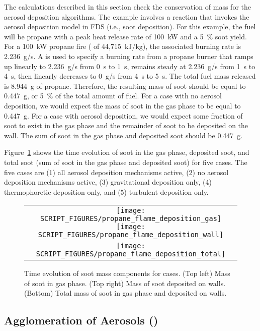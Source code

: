 \documentclass[11pt]{book}
\begin{document}
The calculations described in this section check the conservation of mass for the aerosol deposition algorithms. The example involves a reaction that invokes the aerosol deposition model in FDS (i.e., soot deposition). For this example, the fuel will be propane with a peak heat release rate of 100~kW and a 5~\% soot yield. For a 100~kW propane fire ( of 44,715~kJ/kg), the associated burning rate is 2.236~g/s. A  is used to specify a burning rate from a propane burner that ramps up linearly to 2.236~g/s from 0~s to 1~s, remains steady at 2.236~g/s from 1~s to 4~s, then linearly decreases to 0~g/s from 4~s to 5~s. The total fuel mass released is 8.944~g of propane. Therefore, the resulting mass of soot should be equal to 0.447~g, or 5~\% of the total amount of fuel. For a case with no aerosol deposition, we would expect the mass of soot in the gas phase to be equal to 0.447~g. For a case with aerosol deposition, we would expect some fraction of soot to exist in the gas phase and the remainder of soot to be deposited on the wall. The sum of soot in the gas phase and deposited soot should be 0.447~g.

Figure~\ref{fig:deposition_mass} shows the time evolution of soot in the gas phase, deposited soot, and total soot (sum of soot in the gas phase and deposited soot) for five cases. The five cases are (1) all aerosol deposition mechanisms active, (2) no aerosol deposition mechanisms active, (3) gravitational deposition only, (4) thermophoretic deposition only, and (5) turbulent deposition only.

\begin{figure}[ht]
    \centering
    \begin{tabular}{c}
        \texttt{[image: SCRIPT\_FIGURES/propane\_flame\_deposition\_gas]}
        \texttt{[image: SCRIPT\_FIGURES/propane\_flame\_deposition\_wall]} \\
        \texttt{[image: SCRIPT\_FIGURES/propane\_flame\_deposition\_total]}
    \end{tabular}
    \caption[Soot mass conservation for  case]{Time evolution of soot mass components for  cases. (Top left) Mass of soot in gas phase. (Top right) Mass of soot deposited on walls. (Bottom) Total mass of soot in gas phase and deposited on walls.}
    \label{fig:deposition_mass}
\end{figure}

\subsection{Agglomeration of Aerosols (\texorpdfstring{}{aerosol\_agglomeration})}
    \label{aerosol_agglomeration}
\end{document}

